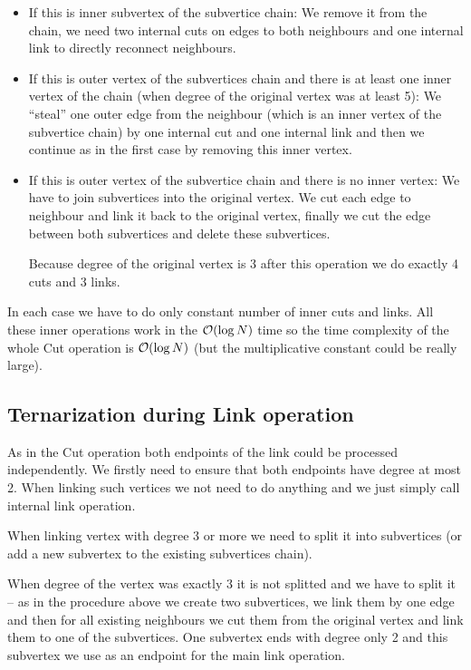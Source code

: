 \begin{itemize}
\item {\I If this is inner subvertex of the subvertice chain:} We remove it
from the chain, we need two internal cuts on edges to both neighbours and one
internal link to directly reconnect neighbours.
\item {\I If this is outer vertex of the subvertices chain and there is at least
one inner vertex of the chain (when degree of the original vertex was
at least 5):} We ``steal'' one outer edge from the neighbour (which is
an inner vertex of the subvertice chain) by one internal cut and one internal
link and then we continue as in the first case by removing this inner vertex.
\item {\I If this is outer vertex of the subvertice chain and there is no inner
vertex:} We have to join subvertices into the original vertex. We cut each edge
to neighbour and link it back to the original vertex, finally we cut the edge
between both subvertices and delete these subvertices.

Because degree of the original vertex is 3 after this operation we do exactly
4 cuts and 3 links.
\end{itemize}

In each case we have to do only constant number of inner cuts and links. All
these inner operations work in the ${\cal O}(\log N)$ time so the time complexity of
the whole Cut operation is ${\cal O}(\log N)$ (but the multiplicative constant could
be really large).

\subsection{Ternarization during Link operation}

As in the Cut operation both endpoints of the link could be processed
independently. We firstly need to ensure that both endpoints have degree at
most 2. When linking such vertices we not need to do anything and we just simply
call internal link operation.

When linking vertex with degree 3 or more we need to split it into subvertices
(or add a new subvertex to the existing subvertices chain).

When degree of the vertex was exactly 3 it is not splitted and we have to split
it -- as in the procedure above we create two subvertices, we link them by one
edge and then for all existing neighbours we cut them from the original vertex
and link them to one of the subvertices. One subvertex ends with degree only
2 and this subvertex we use as an endpoint for the main link operation.

